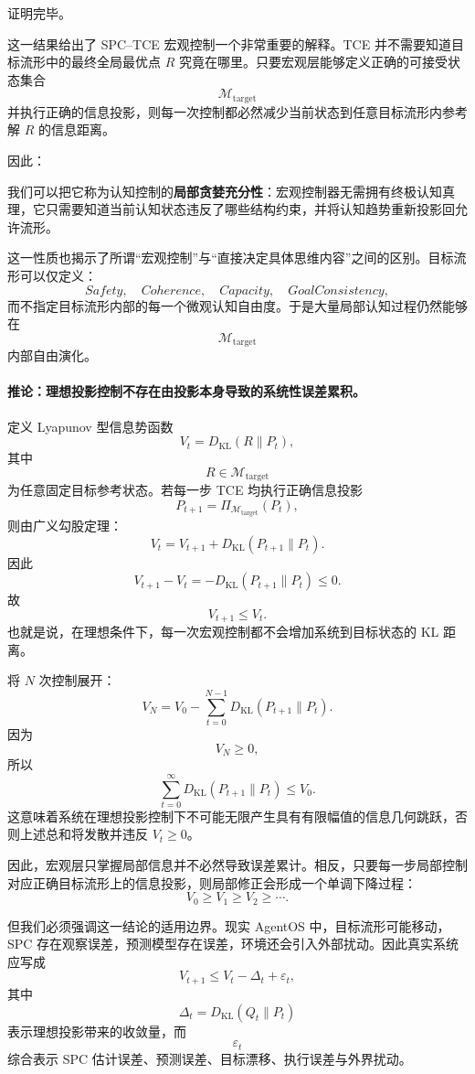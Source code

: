 证明完毕。

这一结果给出了 SPC--TCE 宏观控制一个非常重要的解释。TCE 并不需要知道目标流形中的最终全局最优点 $R$ 究竟在哪里。只要宏观层能够定义正确的可接受状态集合
\[
\mathcal{M}_{\mathrm{target}}
\]
并执行正确的信息投影，则每一次控制都必然减少当前状态到任意目标流形内参考解 $R$ 的信息距离。

因此：
\begin{statementbox}
\centering
{}
\end{statementbox}

我们可以把它称为认知控制的\textbf{局部贪婪充分性}：宏观控制器无需拥有终极认知真理，它只需要知道当前认知状态违反了哪些结构约束，并将认知趋势重新投影回允许流形。

这一性质也揭示了所谓``宏观控制''与``直接决定具体思维内容''之间的区别。目标流形可以仅定义：
\[
Safety,
\quad
Coherence,
\quad
Capacity,
\quad
GoalConsistency,
\]
而不指定目标流形内部的每一个微观认知自由度。于是大量局部认知过程仍然能够在
\[
\mathcal{M}_{\mathrm{target}}
\]
内部自由演化。

\paragraph{推论：理想投影控制不存在由投影本身导致的系统性误差累积。}

定义 Lyapunov 型信息势函数
\[
V_t
=
D_{\mathrm{KL}}(R\|P_t),
\]
其中
\[
R\in\mathcal{M}_{\mathrm{target}}
\]
为任意固定目标参考状态。若每一步 TCE 均执行正确信息投影
\[
P_{t+1}
=
\Pi_{\mathcal{M}_{\mathrm{target}}}(P_t),
\]
则由广义勾股定理：
\[
V_t
=
V_{t+1}
+
D_{\mathrm{KL}}(P_{t+1}\|P_t).
\]
因此
\[
V_{t+1}-V_t
=
-
D_{\mathrm{KL}}(P_{t+1}\|P_t)
\le 0.
\]
故
\[
\boxed{
V_{t+1}\le V_t.
}
\]
也就是说，在理想条件下，每一次宏观控制都不会增加系统到目标状态的 KL 距离。

将 $N$ 次控制展开：
\[
V_N
=
V_0
-
\sum_{t=0}^{N-1}
D_{\mathrm{KL}}
\left(
P_{t+1}\|P_t
\right).
\]
因为
\[
V_N\ge0,
\]
所以
\[
\sum_{t=0}^{\infty}
D_{\mathrm{KL}}
\left(
P_{t+1}\|P_t
\right)
\le
V_0.
\]
这意味着系统在理想投影控制下不可能无限产生具有有限幅值的信息几何跳跃，否则上述总和将发散并违反 $V_t\ge0$。

因此，宏观层只掌握局部信息并不必然导致误差累计。相反，只要每一步局部控制对应正确目标流形上的信息投影，则局部修正会形成一个单调下降过程：
\[
\boxed{
V_0
\ge
V_1
\ge
V_2
\ge
\cdots.
}
\]

但我们必须强调这一结论的适用边界。现实 AgentOS 中，目标流形可能移动，SPC 存在观察误差，预测模型存在误差，环境还会引入外部扰动。因此真实系统应写成
\[
V_{t+1}
\le
V_t
-
\Delta_t
+
\varepsilon_t,
\label{eq:perturbed-information-geometric-control}
\]
其中
\[
\Delta_t
=
D_{\mathrm{KL}}
\left(
Q_t\|P_t
\right)
\]
表示理想投影带来的收敛量，而
\[
\varepsilon_t
\]
综合表示 SPC 估计误差、预测误差、目标漂移、执行误差与外界扰动。

